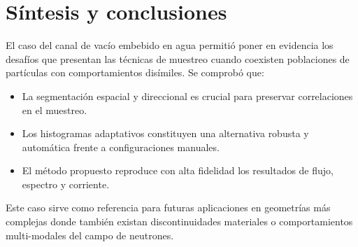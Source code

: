 \section{Síntesis y conclusiones}

El caso del canal de vacío embebido en agua permitió poner en evidencia los desafíos que presentan las técnicas de muestreo cuando coexisten poblaciones de partículas con comportamientos disímiles. Se comprobó que:

\begin{itemize}
    \item La segmentación espacial y direccional es crucial para preservar correlaciones en el muestreo.
    \item Los histogramas adaptativos constituyen una alternativa robusta y automática frente a configuraciones manuales.
    \item El método propuesto reproduce con alta fidelidad los resultados de flujo, espectro y corriente.
\end{itemize}

Este caso sirve como referencia para futuras aplicaciones en geometrías más complejas donde también existan discontinuidades materiales o comportamientos multi-modales del campo de neutrones.

